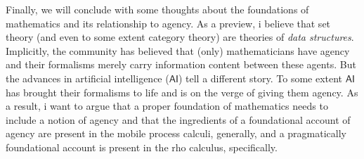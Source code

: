 Finally, we will conclude with some thoughts about the foundations of
mathematics and its relationship to agency. As a preview, i believe
that set theory (and even to some extent category theory) are theories
of \emph{data structures}. Implicitly, the community has believed that
(only) mathematicians have agency and their formalisms merely carry
information content between these agents. But the advances in
artificial intelligence ($\mathsf{AI}$) tell a different story. To
some extent $\mathsf{AI}$ has brought their formalisms to life and is
on the verge of giving them agency. As a result, i want to argue that
a proper foundation of mathematics needs to include a notion of agency
and that the ingredients of a foundational account of agency are
present in the mobile process calculi, generally, and a pragmatically
foundational account is present in the rho calculus, specifically.

